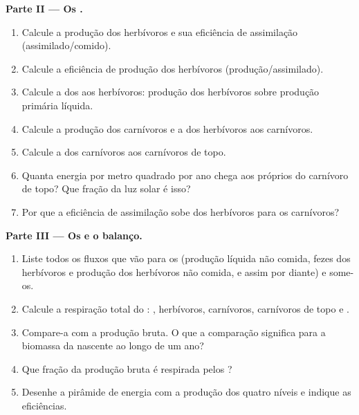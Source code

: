 \begin{problem}
\medskip
\noindent\textbf{Parte II --- Os .}
\begin{enumerate}[resume]
  \item Calcule a produção dos herbívoros e sua eficiência de
        assimilação (assimilado/comido).
  \item Calcule a eficiência de produção dos herbívoros
        (produção/assimilado).
  \item Calcule a  dos  aos herbívoros:
        produção dos herbívoros sobre produção primária líquida.
  \item Calcule a produção dos carnívoros e a  dos
        herbívoros aos carnívoros.
  \item Calcule a  dos carnívoros aos carnívoros de
        topo.
  \item Quanta energia por metro quadrado por ano chega aos próprios
         do carnívoro de topo? Que fração da luz solar é isso?
  \item Por que a eficiência de assimilação sobe dos herbívoros para
        os carnívoros?
\end{enumerate}

\medskip
\noindent\textbf{Parte III --- Os  e o balanço.}
\begin{enumerate}[resume]
  \item Liste todos os fluxos que vão para os  (produção
        líquida não comida, fezes dos herbívoros e produção dos
        herbívoros não comida, e assim por diante) e some-os.
  \item Calcule a respiração total do : ,
        herbívoros, carnívoros, carnívoros de topo e .
  \item Compare-a com a produção bruta. O que a comparação significa
        para a biomassa da nascente ao longo de um ano?
  \item Que fração da produção bruta é respirada pelos ?
  \item Desenhe a pirâmide de energia com a produção dos quatro níveis
        e indique as eficiências.
\end{enumerate}


\end{problem}
